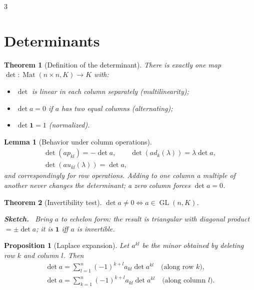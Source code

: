 \documentclass[10pt,a4paper,landscape]{article}
\theoremstyle{definition}
\theoremstyle{plain}
\newtheorem{thm}{Theorem}[section]
\newtheorem{lem}{Lemma}[section]
\newtheorem{prop}{Proposition}[section]
\theoremstyle{remark}
\DeclareMathOperator{\Mat}{Mat}
\DeclareMathOperator{\GL}{GL}
\newcommand{\one}{\mathbf{1}}
\newenvironment{proofsketch}{%
  \par\small\color{exgray}\textbf{Sketch.}\ }%
  {\par}
\begin{document}
\begin{multicols*}{3}
\section{Determinants}

\begin{thm}[Definition of the determinant]
There is exactly one map $\det: \Mat(n \times n, K) \to K$ with:
\begin{itemize}
\item $\det$ is linear in each column separately (multilinearity);
\item $\det a = 0$ if $a$ has two equal columns (alternating);
\item $\det \one = 1$ (normalized).
\end{itemize}
\end{thm}

\begin{lem}[Behavior under column operations]
{\footnotesize\[
\begin{gathered}
\det(a p_{kl}) = -\det a, \qquad \det(a d_k(\lambda)) = \lambda \det a,\\
\det(a u_{kl}(\lambda)) = \det a,
\end{gathered}
\]}
and correspondingly for row operations. Adding to one column a multiple of another never changes the determinant; a zero column forces $\det a = 0$.
\end{lem}

\begin{thm}[Invertibility test]
$\det a \neq 0 \iff a \in \GL(n,K)$.
\begin{proofsketch}
Bring $a$ to echelon form: the result is triangular with diagonal product $= \pm \det a$; it is $\one$ iff $a$ is invertible.
\end{proofsketch}
\end{thm}

\begin{prop}[Laplace expansion]
Let $a^{kl}$ be the minor obtained by deleting row $k$ and column $l$. Then
{\footnotesize\[
\begin{gathered}
\det a = \sum_{l=1}^{n} (-1)^{k+l} a_{kl} \det a^{kl} \quad \text{(along row $k$)},\\
\det a = \sum_{k=1}^{n} (-1)^{k+l} a_{kl} \det a^{kl} \quad \text{(along column $l$).}
\end{gathered}
\]}
\end{prop}


\end{multicols*}
\end{document}
